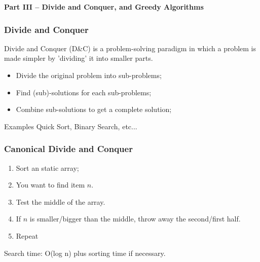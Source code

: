 \begin{frame}
  \begin{center}
    {\bf Part III -- Divide and Conquer, and Greedy Algorithms}
  \end{center}
\end{frame}

\begin{frame}
  \frametitle{Divide and Conquer}



  Divide and Conquer (D\&C) is a problem-solving paradigm in which a
  problem is made simpler by 'dividing' it into smaller parts.\bigskip

  \begin{itemize}
  \item Divide the original problem into sub-problems;
  \item Find (sub)-solutions for each sub-problems;
  \item Combine sub-solutions to get a complete solution;
  \end{itemize}\bigskip

  \begin{block}{Examples}
    Quick Sort, Binary Search, etc...
  \end{block}
\end{frame}

\begin{frame}
  \frametitle{Canonical Divide and Conquer}
  \begin{enumerate}
  \item Sort an static array;
  \item You want to find item $n$.
  \item Test the middle of the array.
  \item If $n$ is smaller/bigger than the middle, throw away the second/first half.
  \item Repeat
  \end{enumerate}

  \vfill

  Search time: O(log n) plus sorting time if necessary.
\end{frame}



